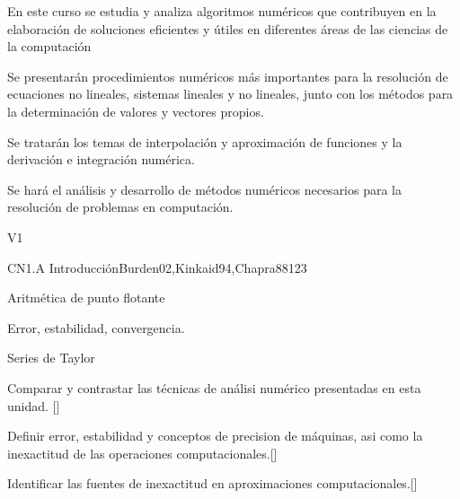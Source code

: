 \begin{syllabus}


\begin{justification}
En este curso se estudia y analiza algoritmos numéricos que
contribuyen en la elaboración de soluciones eficientes y útiles en
diferentes áreas de las ciencias de la computación
\end{justification}

\begin{goals}
\item Se presentarán procedimientos numéricos más importantes para la resolución de 
ecuaciones no lineales, sistemas lineales y no lineales, junto con los métodos 
para la determinación de valores y vectores propios.

\item Se tratarán los temas de interpolación y aproximación de funciones y la 
derivación e integración numérica.

\item Se hará el análisis y desarrollo de métodos numéricos necesarios para la 
resolución de problemas en computación.
\end{goals}

\begin{outcomes}{V1}
\item {}
\item {}
\item {}
\end{outcomes}

\begin{competences} 
    \item {}
    \item {}
\end{competences}

\begin{unit}{}{CN1.A Introducción}{Burden02,Kinkaid94,Chapra88}{12}{3}
  \begin{topics}
      \item Aritmética de punto flotante
      \item Error, estabilidad, convergencia.
      \item Series de Taylor
   \end{topics}

   \begin{learningoutcomes}
      \item Comparar y contrastar las técnicas de análisi numérico presentadas en esta unidad. [\Usage]
      \item Definir error, estabilidad y conceptos de precision de máquinas, asi como la inexactitud de las operaciones computacionales.[\Usage]
      \item Identificar las fuentes de inexactitud en aproximaciones computacionales.[\Usage]
   \end{learningoutcomes}
\end{unit}


\end{syllabus}
